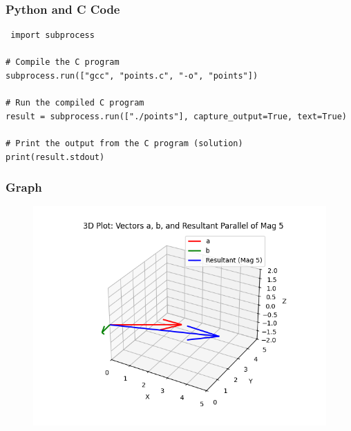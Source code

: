 \documentclass{beamer}
\begin{document}
\begin{frame}[fragile]
\frametitle{Python and C Code}

\begin{lstlisting}
 import subprocess

# Compile the C program
subprocess.run(["gcc", "points.c", "-o", "points"])

# Run the compiled C program
result = subprocess.run(["./points"], capture_output=True, text=True)

# Print the output from the C program (solution)
print(result.stdout) 

\end{lstlisting}
\end{frame}


\begin{frame}[fragile]
\frametitle{Graph}

\begin{figure}[H]
\begin{center}
\includegraphics[width=0.75\columnwidth]{../figs/graph.png}
\end{center}
\caption{}
\label{fig:Fig}
\end{figure}




\end{frame}
\end{document}
